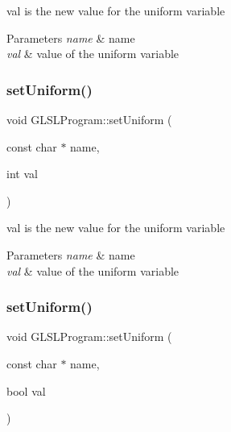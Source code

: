 val is the new value for the uniform variable 


\begin{DoxyParams}{Parameters}
{\em name} & name \\
\hline
{\em val} & value of the uniform variable \\
\hline
\end{DoxyParams}
\hypertarget{class_g_l_s_l_program_a437782e359f10918044f1bbad0a98148}{}\label{class_g_l_s_l_program_a437782e359f10918044f1bbad0a98148} 
\subsubsection{\texorpdfstring{set\+Uniform()}{setUniform()}\hspace{0.1cm}{\footnotesize\ttfamily [5/8]}}
{\footnotesize\ttfamily void G\+L\+S\+L\+Program\+::set\+Uniform (\begin{DoxyParamCaption}\item[{const char $\ast$}]{name,  }\item[{int}]{val }\end{DoxyParamCaption})}



val is the new value for the uniform variable 


\begin{DoxyParams}{Parameters}
{\em name} & name \\
\hline
{\em val} & value of the uniform variable \\
\hline
\end{DoxyParams}
\hypertarget{class_g_l_s_l_program_acfab16fafb4617f0625f170b39716eb8}{}\label{class_g_l_s_l_program_acfab16fafb4617f0625f170b39716eb8} 
\subsubsection{\texorpdfstring{set\+Uniform()}{setUniform()}\hspace{0.1cm}{\footnotesize\ttfamily [6/8]}}
{\footnotesize\ttfamily void G\+L\+S\+L\+Program\+::set\+Uniform (\begin{DoxyParamCaption}\item[{const char $\ast$}]{name,  }\item[{bool}]{val }\end{DoxyParamCaption})}



